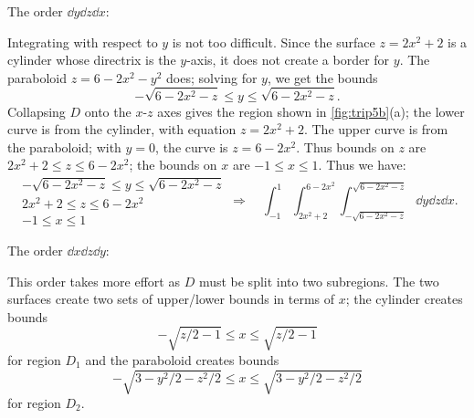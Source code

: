 \begin{example}
\noindent The order $\dd y\dd z\dd x$:\bigskip

Integrating with respect to $y$ is not too difficult. Since the surface $z=2x^2+2$ is a cylinder whose directrix is the $y$-axis, it does not create a border for $y$. The paraboloid $z=6-2x^2-y^2$ does; solving for $y$, we get the bounds 
\[-\sqrt{6-2x^2-z}\leq y\leq \sqrt{6-2x^2-z}.\]
Collapsing $D$ onto the $x$-$z$ axes gives the region shown in \autoref{fig:trip5b}(a); the lower curve is from the cylinder, with equation $z=2x^2+2$. The upper curve is from the paraboloid; with $y=0$, the curve is $z=6-2x^2$. Thus bounds on $z$ are $2x^2+2\leq z\leq 6-2x^2$; the bounds on $x$ are $-1\leq x\leq 1$. Thus we have:
\[
	\begin{gathered}
		-\sqrt{6-2x^2-z}\leq y\leq \sqrt{6-2x^2-z}\\
		2x^2+2\leq z\leq 6-2x^2\\
		-1\leq x\leq 1
	\end{gathered}
	\Rightarrow\quad
	\int_{-1}^1\int_{2x^2+2}^{6-2x^2}\int_{-\sqrt{6-2x^2-z}}^{\sqrt{6-2x^2-z}}\dd y\dd z\dd x.
\]


\noindent The order $\dd x\dd z\dd y$:\bigskip

This order takes more effort as $D$ must be split into two subregions. The two surfaces create two sets of upper/lower bounds in terms of $x$; the cylinder creates bounds
\[-\sqrt{z/2-1}\leq x\leq \sqrt{z/2-1}\]
for region $D_1$  and the paraboloid creates bounds
\[-\sqrt{3-y^2/2-z^2/2}\leq x\leq \sqrt{3-y^2/2-z^2/2}\]
for region $D_2$.


\end{example}
